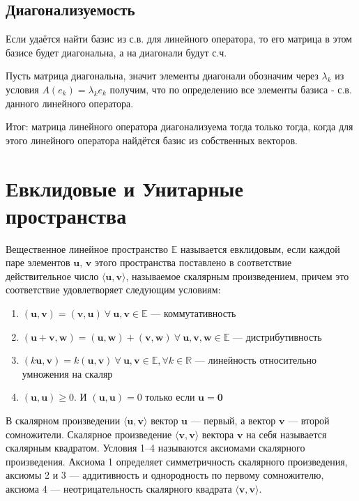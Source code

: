 \documentclass[12pt]{article}
\begin{document}
\subsection{Диагонализуемость}

Если удаётся найти базис из с.в. для линейного оператора, то его матрица в этом базисе будет диагональна, а на диагонали будут с.ч.

Пусть матрица диагональна, значит элементы диагонали обозначим через $\lambda_k$ из условия $A(e_k) = \lambda_k e_k$ получим, что по определению все элементы базиса - с.в. данного линейного оператора.

Итог: матрица линейного оператора диагонализуема тогда только тогда, когда для этого линейного оператора найдётся базис из собственных векторов.

\section{Евклидовые и Унитарные пространства}
Вещественное линейное пространство $\mathbb{E}$ называется евклидовым, если каждой паре элементов $\mathbf{u},\,\mathbf{v}$ этого пространства поставлено в соответствие действительное число $\langle \mathbf{u},\mathbf{v} \rangle$, называемое скалярным произведением, причем это соответствие удовлетворяет следующим условиям:
\begin{enumerate}
    \item $(\mathbf{u},\mathbf{v})=(\mathbf{v},\mathbf{u})\ \forall\ \mathbf{u},\mathbf{v}\in \mathbb{E}$ --- коммутативность

    \item $(\mathbf{u} + \mathbf{v},\mathbf{w})=(\mathbf{u},\mathbf{w})+(\mathbf{v},\mathbf{w})\ \forall\ \mathbf{u},\mathbf{v},\mathbf{w}\in \mathbb{E}$ --- дистрибутивность

    \item $(k\mathbf{u},\mathbf{v})=k(\mathbf{u},\mathbf{v})\ \forall\ \mathbf{u},\mathbf{v}\in \mathbb{E},\forall k\in \mathbb{R}$ --- линейность относительно умножения на скаляр

    \item $(\mathbf{u},\mathbf{u})\geq 0$. И $(\mathbf{u},\mathbf{u})=0$ только если $\mathbf{u}=\mathbf{0}$
\end{enumerate}
В скалярном произведении $\langle\mathbf{u}, \mathbf{v}\rangle$ вектор $\mathbf{u}$ — первый, а вектор $\mathbf{v}$ — второй сомножители. Скалярное произведение $\langle\mathbf{v},\mathbf{v}\rangle$ вектора $\mathbf{v}$ на себя называется скалярным квадратом. Условия 1–4 называются аксиомами скалярного произведения. Аксиома 1 определяет симметричность скалярного произведения, аксиомы 2 и 3 — аддитивность и однородность по первому сомножителю, аксиома 4 — неотрицательность скалярного квадрата $\langle\mathbf{v}, \mathbf{v}\rangle$.
\end{document}
